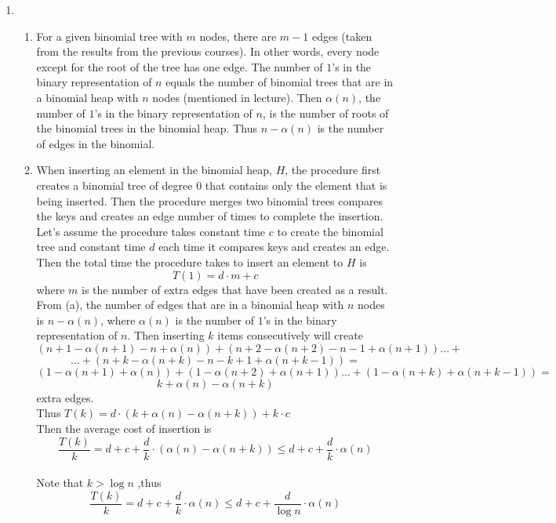 \documentclass{article}
\begin{document}
\begin{enumerate}
\item 
    \begin{enumerate}
        \item For a given binomial tree with $m$ nodes, there are $m-1$ edges (taken from the results from the previous courses). In other words, every node except for the root of the tree has one edge. The number of $1$'s in the binary representation of $n$ equals the number of binomial trees that are in a binomial heap with $n$ nodes (mentioned in lecture). Then $\alpha(n)$, the number of $1$'s in the binary representation of $n$, is the number of roots of the binomial trees in the binomial heap. Thus $n-\alpha(n)$ is the number of edges in the binomial.
        \item When inserting an element in the binomial heap, $H$, the procedure first creates a binomial tree of degree 0 that contains only the element that is being inserted. Then the procedure merges two binomial trees compares the keys and creates an edge number of times to complete the insertion. Let's assume the procedure takes constant time $c$ to create the binomial tree and constant time $d$ each time it compares keys and creates an edge.
        \\Then the total time the procedure takes to insert an element to $H$ is $$T(1) = d\cdot m + c$$ where $m$ is the number of extra edges that have been created as a result.
        \\ From (a), the number of edges that are in a binomial heap with $n$ nodes is $n - \alpha(n)$, where $\alpha(n)$ is the number of $1$'s in the binary representation of $n$. Then inserting $k$ items consecutively will create 
        $$(n + 1 -\alpha(n+1) - n + \alpha(n)) + (n + 2 -\alpha(n+2) - n - 1 + \alpha(n + 1)) \dots+$$ 
        $$\dots+(n + k -\alpha(n+k) - n - k + 1 + \alpha(n + k - 1))=$$
        $$ (1 -\alpha(n+1) + \alpha(n)) + (1 -\alpha(n+2) + \alpha(n + 1)) \dots + (1 -\alpha(n+k) + \alpha(n+k-1))=$$
        $$k + \alpha(n) - \alpha(n+k)$$
        extra edges.
        \\Thus $T(k) = d \cdot (k + \alpha(n) - \alpha(n+k)) + k \cdot c$
        \\Then the average cost of insertion is $$\frac{T(k)}{k} = d + c + \frac{d}{k}\cdot(\alpha(n) - \alpha(n+k))\le d + c + \frac{d}{k}\cdot \alpha(n) $$
        \\ Note that $ k > \log n$ ,thus \\$$\frac{T(k)}{k} = d + c + \frac{d}{k}\cdot \alpha(n) \le d + c + \frac{d}{\log n}\cdot \alpha(n) $$

\end{enumerate}
\end{enumerate}
\end{document}
